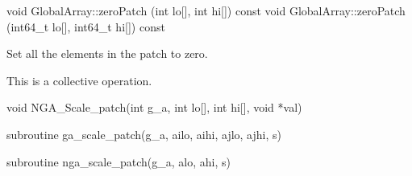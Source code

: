 \documentclass[12pt]{article}
\begin{document}
\begin{cxxapi}
\begin{cxxcode}
void GlobalArray::zeroPatch (int lo[], int hi[]) const
void GlobalArray::zeroPatch (int64_t lo[], int64_t hi[]) const
\end{cxxcode}
\begin{funcargs}
\end{funcargs}
\end{cxxapi}
\gcoll

\begin{desc}


Set all the elements in the patch to zero.

This is a collective operation.

\end{desc}


\begin{capi}
\begin{ccode}
void NGA_Scale_patch(int g_a, int lo[], int hi[], void *val)
\end{ccode}
\begin{funcargs}
\end{funcargs}
\end{capi}

\begin{f2dapi}
\begin{fcode}
subroutine ga_scale_patch(g_a, ailo, aihi, ajlo, ajhi, s)
\end{fcode}
\begin{funcargs}
\end{funcargs}
\end{f2dapi}

\begin{fapi}
\begin{fcode}
subroutine nga_scale_patch(g_a, alo, ahi, s)
\end{fcode}
\begin{funcargs}
\end{funcargs}
\end{fapi}
\end{document}
